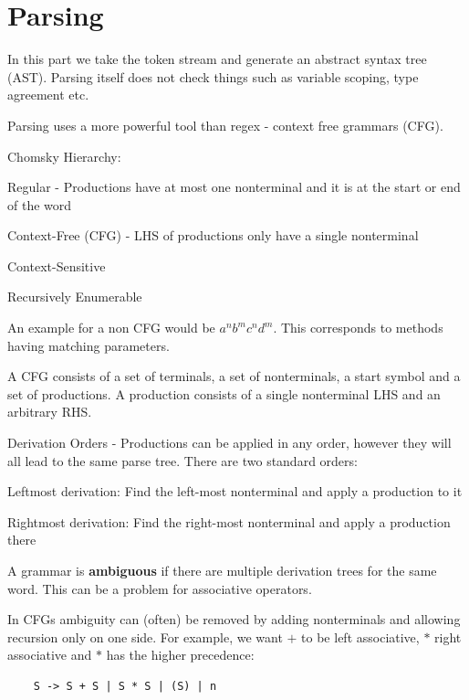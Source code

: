 \section*{Parsing}

In this part we take the token stream and generate an abstract syntax tree (AST). Parsing itself does not check things such as variable scoping, type agreement etc. \medskip

Parsing uses a more powerful tool than regex - context free grammars (CFG). \medskip

Chomsky Hierarchy: 
\begin{compactitem}
	\item Regular - Productions have at most one nonterminal and it is at the start or end of the word
	\item Context-Free (CFG) - LHS of productions only have a single nonterminal
	\item Context-Sensitive 
	\item Recursively Enumerable
\end{compactitem}

An example for a non CFG would be $a^n b^m c^n d^m$. This corresponds to methods having matching parameters.\medskip
	
A CFG consists of a set of terminals, a set of nonterminals, a start symbol and a set of productions. A production consists of a single nonterminal LHS and an arbitrary RHS. \medskip

Derivation Orders - Productions can be applied in any order, however they will all lead to the same parse tree. There are two standard orders:
\begin{compactitem}
	\item Leftmost derivation: Find the left-most nonterminal and apply a production to it
	\item Rightmost derivation: Find the right-most nonterminal and apply a production there
\end{compactitem}

A grammar is \textbf{ambiguous} if there are multiple derivation trees for the same word. This can be a problem for associative operators. \medskip
	
In CFGs ambiguity can (often) be removed by adding nonterminals and allowing recursion only on one side. For example, we want $+$ to be left associative, $*$ right associative and $*$ has the higher precedence:\smallskip

\begin{lstlisting}
	S -> S + S | S * S | (S) | n
\end{lstlisting} \smallskip

